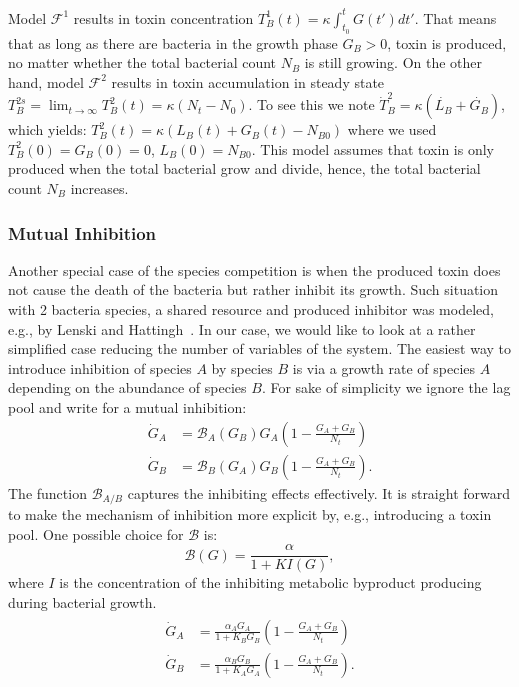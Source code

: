 \documentclass[10pt,twocolumn,5p]{elsarticle}
\numberwithin{equation}{section}
\begin{document}
%
Model $\mathcal{F}^1$ results in toxin concentration $T_B^1(t)=\kappa\int_{t_0}^tG(t')dt'$.
That means that as long as there are bacteria in the growth phase $G_B>0$, toxin is produced, no matter whether the total bacterial count $N_B$ is still growing.
On the other hand, model $\mathcal{F}^2$ results in toxin accumulation in steady state $T_B^{2s}=\lim_{t\to\infty}T_B^2(t)=\kappa(N_t-N_0)$.
To see this we note $\dot{T}_B^2=\kappa(\dot{L_B}+\dot{G_B})$, which yields: $T_B^2(t)=\kappa(L_B(t)+G_B(t)-N_{B0})$ where we used $T_B^2(0)=G_B(0)=0$, $L_B(0)=N_{B0}$.
This model assumes that toxin is only produced when the total bacterial grow and divide, hence, the total bacterial count $N_B$ increases.
%
%
\subsubsection{Mutual Inhibition}
Another special case of the species competition is when the produced toxin does not cause the death of the bacteria but rather inhibit its growth.
Such situation with 2 bacteria species, a shared resource and produced inhibitor was modeled, e.g., by Lenski and Hattingh~\cite{lenski_coexistence_1986}.
In our case, we would like to look at a rather simplified case reducing the number of variables of the system.
The easiest way to introduce inhibition of species $A$ by species $B$ is via a growth rate of species $A$ depending on the abundance of species $B$.
For sake of simplicity we ignore the lag pool and write for a mutual inhibition:
\begin{align}
    \dot{G}_A &= \mathcal{B}_A(G_B)G_A\left(1 - \frac{G_A+G_B}{N_t}\right)\\
    \dot{G}_B &= \mathcal{B}_B(G_A) G_B\left(1-\frac{G_A+G_B}{N_t}\right).
\end{align}
The function $\mathcal{B}_{A/B}$ captures the inhibiting effects effectively.
It is straight forward to make the mechanism of inhibition more explicit by, e.g., introducing a toxin pool.
One possible choice for $\mathcal{B}$ is:
\begin{equation}
    \mathcal{B}(G) = \frac{\alpha}{1+KI(G)},
\end{equation}
where $I$ is the concentration of the inhibiting metabolic byproduct producing during bacterial growth.
\begin{align}\begin{split}
    \dot{G}_A &= \frac{\alpha_A G_A}{1+K_BG_B}\left(1 - \frac{G_A+G_B}{N_t}\right)\\
    \dot{G}_B &= \frac{\alpha_B G_B}{1+K_AG_A}\left(1-\frac{G_A+G_B}{N_t}\right).
\end{split}\end{align}
\end{document}
